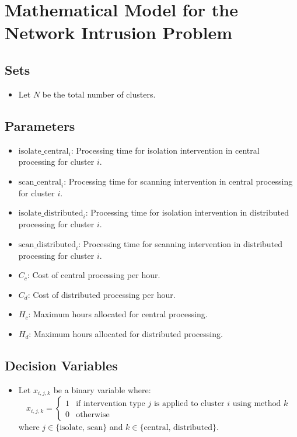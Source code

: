 \documentclass{article}
\begin{document}
\section*{Mathematical Model for the Network Intrusion Problem}

\subsection*{Sets}
\begin{itemize}
    \item Let \( N \) be the total number of clusters.
\end{itemize}

\subsection*{Parameters}
\begin{itemize}
    \item \( \text{isolate\_central}_i \): Processing time for isolation intervention in central processing for cluster \( i \).
    \item \( \text{scan\_central}_i \): Processing time for scanning intervention in central processing for cluster \( i \).
    \item \( \text{isolate\_distributed}_i \): Processing time for isolation intervention in distributed processing for cluster \( i \).
    \item \( \text{scan\_distributed}_i \): Processing time for scanning intervention in distributed processing for cluster \( i \).
    \item \( C_c \): Cost of central processing per hour.
    \item \( C_d \): Cost of distributed processing per hour.
    \item \( H_c \): Maximum hours allocated for central processing.
    \item \( H_d \): Maximum hours allocated for distributed processing.
\end{itemize}

\subsection*{Decision Variables}
\begin{itemize}
    \item Let \( x_{i,j,k} \) be a binary variable where:
    \[
    x_{i,j,k} = 
    \begin{cases} 
    1 & \text{if intervention type } j \text{ is applied to cluster } i \text{ using method } k \\
    0 & \text{otherwise}
    \end{cases}
    \]
    where \( j \in \{\text{isolate, scan}\} \) and \( k \in \{\text{central, distributed}\} \).
\end{itemize}
\end{document}
